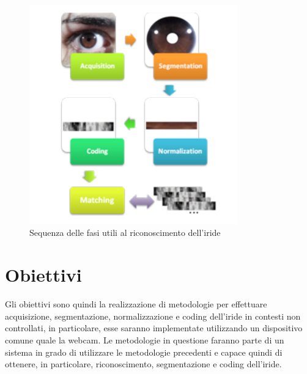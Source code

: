 \begin{figure}[h!]
	\centering
	\includegraphics[width=90mm]{img/1/bio_1_1.PNG}
	\caption{\fontsize{10px}{0mm}\selectfont Sequenza delle fasi utili al riconoscimento dell'iride \label{fig:bio_1_1}}
\end{figure}
\section{Obiettivi}
\vspace{8mm}
Gli obiettivi sono quindi la realizzazione di metodologie per effettuare acquisizione, segmentazione, normalizzazione e coding dell'iride in contesti non controllati, in particolare, esse saranno implementate utilizzando un dispositivo comune quale la webcam.
Le metodologie in questione faranno parte di un sistema in grado di utilizzare le metodologie precedenti e capace quindi di ottenere, in particolare, riconoscimento, segmentazione e coding dell'iride.\newpage